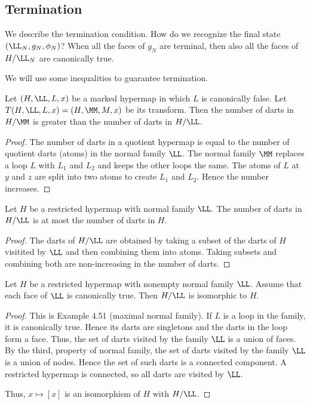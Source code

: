 \subsection{Termination}


We describe the termination condition.  How do we recognize
the final state $(\LL_N,g_N,\phi_N)$?  When all the faces
of $g_N$ are terminal, then also all the faces of $H/\LL_N$ are
canonically true.  

We will use some inequalities to guarantee termination.

\begin{lemma}  
  Let $(H,\LL,L,x)$ be a marked hypermap in which $L$ is canonically
  false.  Let $T(H,\LL,L,x) = (H,\MM,M,x)$ be its transform.  Then the
  number of darts in $H/\MM$ is greater than the number of darts in
  $H/\LL$.
\end{lemma} 

\begin{proof}  The number of darts in a quotient hypermap is equal
to the number of quotient darts (atoms) in the normal family $\LL$.
The normal family $\MM$ replaces a loop $L$ with $L_1$ and $L_2$
and keeps the other loops the same.  The atoms of $L$ at
$y$ and $z$ are split into two atoms to create $L_1$ and $L_2$.
Hence the number increases.
\end{proof}

\begin{lemma}
 Let $H$ be a restricted hypermap with normal family
$\LL$.  The number of darts in $H/\LL$ is at most the number of
darts in $H$.  
\end{lemma} 

\begin{proof} The darts of $H/\LL$ are obtained by taking a subset
of the darts of $H$ visitited by $\LL$ and then combining them into
atoms.  Taking subsets and combining both are non-increasing
in the number of darts.  
\end{proof}

\begin{lemma}
Let $H$ be a restricted hypermap with nonempty
normal family
$\LL$.  Assume that each face of $\LL$ is canonically true.  Then
$H/\LL$ is isomorphic to $H$.
\end{lemma} 

\begin{proof} This is Example 4.51 (maximal normal family).
If $L$ is a loop in the family, it is canonically true.  Hence its
darts are singletons and the darts in the loop form a face.  Thus,
the set of darts visited by the family $\LL$ is a union of faces.
By the third, property of normal family, the set of darts visited by
the family $\LL$ is a union of nodes.  Hence the set of such darts is
a connected component.  A restricted hypermap is connected,
so all darts are visited by $\LL$.  

Thus, $x \mapsto [x]$ is an isomorphism of $H$ with $H/\LL$.
\end{proof}


